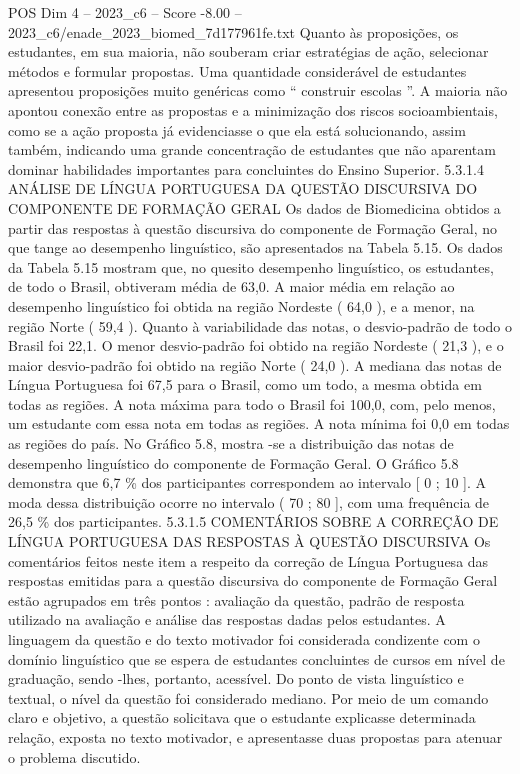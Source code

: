 \begin{textsample}{POS Dim 4 – 2023\_c6 – Score -8.00 – 2023\_c6/enade\_2023\_biomed\_7d177961fe.txt}
Quanto às proposições, os estudantes, em sua maioria, não souberam criar estratégias de ação, selecionar métodos e formular propostas.
Uma quantidade considerável de estudantes apresentou proposições muito genéricas como “ construir escolas ”.
A maioria não apontou conexão entre as propostas e a minimização dos riscos socioambientais, como se a ação proposta já evidenciasse o que ela está solucionando, assim também, indicando uma grande concentração de estudantes que não aparentam dominar habilidades importantes para concluintes do Ensino Superior. 5.3.1.4 ANÁLISE DE LÍNGUA PORTUGUESA DA QUESTÃO DISCURSIVA DO COMPONENTE DE FORMAÇÃO GERAL Os dados de Biomedicina obtidos a partir das respostas à questão discursiva do componente de Formação Geral, no que tange ao desempenho linguístico, são apresentados na Tabela 5.15.
Os dados da Tabela 5.15 mostram que, no quesito desempenho linguístico, os estudantes, de todo o Brasil, obtiveram média de 63,0.
A maior média em relação ao desempenho linguístico foi obtida na região Nordeste ( 64,0 ), e a menor, na região Norte ( 59,4 ).
Quanto à variabilidade das notas, o desvio-padrão de todo o Brasil foi 22,1.
O menor desvio-padrão foi obtido na região Nordeste ( 21,3 ), e o maior desvio-padrão foi obtido na região Norte ( 24,0 ).
A mediana das notas de Língua Portuguesa foi 67,5 para o Brasil, como um todo, a mesma obtida em todas as regiões.
A nota máxima para todo o Brasil foi 100,0, com, pelo menos, um estudante com essa nota em todas as regiões.
A nota mínima foi 0,0 em todas as regiões do país.
No Gráfico 5.8, mostra -se a distribuição das notas de desempenho linguístico do componente de Formação Geral.
O Gráfico 5.8 demonstra que 6,7 \% dos participantes correspondem ao intervalo [ 0 ; 10 ].
A moda dessa distribuição ocorre no intervalo ( 70 ; 80 ], com uma frequência de 26,5 \% dos participantes. 5.3.1.5 COMENTÁRIOS SOBRE A CORREÇÃO DE LÍNGUA PORTUGUESA DAS RESPOSTAS À QUESTÃO DISCURSIVA Os comentários feitos neste item a respeito da correção de Língua Portuguesa das respostas emitidas para a questão discursiva do componente de Formação Geral estão agrupados em três pontos : avaliação da questão, padrão de resposta utilizado na avaliação e análise das respostas dadas pelos estudantes.
A linguagem da questão e do texto motivador foi considerada condizente com o domínio linguístico que se espera de estudantes concluintes de cursos em nível de graduação, sendo -lhes, portanto, acessível.
Do ponto de vista linguístico e textual, o nível da questão foi considerado mediano.
Por meio de um comando claro e objetivo, a questão solicitava que o estudante explicasse determinada relação, exposta no texto motivador, e apresentasse duas propostas para atenuar o problema discutido.

\end{textsample}
